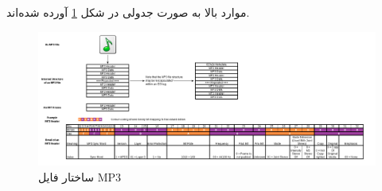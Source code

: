  موارد بالا به صورت جدولی در شکل 
 \ref{mp3_structure}
 آورده شده‌اند.

 \begin{figure}[]
         \centering
         \includegraphics[width=\textwidth]{figs/mp3_file_structure.png}
         \caption{ساختار فایل MP3}
         \label{mp3_structure}
 \end{figure}